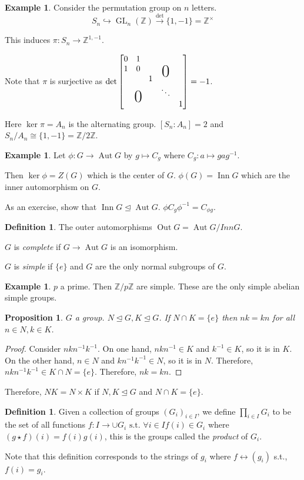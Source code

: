 \documentclass{amsart}
\newtheorem{prop}[thm]{Proposition}
\theoremstyle{definition}
\newtheorem{definition}[thm]{Definition}
\newtheorem{example}[thm]{Example}
\newcommand{\Z}{\mathbb Z}
\newcommand{\st}{\text{ s.t. }}
\DeclareMathOperator{\GL}{GL}
\newcommand\bigzero{\makebox(0,0){\text{\huge0}}}
\DeclareMathOperator{\Aut}{Aut}
\DeclareMathOperator{\Inn}{Inn}
\DeclareMathOperator{\Out}{Out}
\begin{document}
\begin{example}
	Consider the permutation group on $n$ letters. 
	$$S_n\hookrightarrow \GL_n(\Z)\overset{\det}\to\{1,-1\}=\Z^\times$$
	
	This induces $\pi:S_n\to \Z^{1,-1}$. 
	
	Note that $\pi$ is surjective as $\det\begin{bmatrix}
0&1&&&\\
1&0&&\bigzero&\\
&&1&&\\
&\bigzero&&\ddots&\\
&&&&1	
\end{bmatrix}
=-1$.

Here $\ker\pi=A_n$ is the alternating group. $[S_n:A_n]=2$ and $S_n/A_n\cong\{1,-1\}=\Z/2\Z$.
\end{example}
\begin{example}
Let $\phi:G\to \Aut G$ by $g\mapsto C_g$ where $C_g:a\mapsto gag^{-1}$.

Then $\ker\phi=Z(G)$ which is the center of $G$. $\phi(G)=\Inn G$ which are the inner automorphism on $G$. 	
\end{example}
As an exercise, show that $\Inn G\unlhd \Aut G$. $\phi C_g\phi^{-1}=C_{\phi g}$.
\begin{definition}
The outer automorphisms $\Out G=\Aut G/Inn G$.

$G$ is \emph{complete} if $G\to \Aut G$ is an isomorphism.

$G$ is \emph{simple} if $\{e\}$ and $G$ are the only normal subgroups of $G$.	
\end{definition}
\begin{example}
	$p$ a prime. Then $\Z/p\Z$ are simple. These are the only simple abelian simple groups. 	
\end{example}
\begin{prop}
$G$ a group. $N\unlhd G, K\unlhd G$. If $N\cap K=\{e\}$ then $nk=kn$ for all $n\in N, k\in K$.	
\end{prop}
\begin{proof}
Consider $nkn^{-1}k^{-1}$. On one hand, $nkn^{-1}\in K$	 and $k^{-1}\in K$, so it is in $K$. On the other hand, $n\in N$ and $kn^{-1}k^{-1}\in N$, so it is in $N$. Therefore, $nkn^{-1}k^{-1}\in K\cap N=\{e\}$. Therefore, $nk=kn$.
\end{proof}
Therefore, $NK=N\times K$ if $N,K\unlhd G$ and $N\cap K=\{e\}$.
\begin{definition}
	Given a collection of groups $(G_i)_{i\in I}$, we define $\prod\limits_{i\in I}G_i$ to be the set of all functions $f:I\to\cup G_i\st \forall i\in I f(i)\in G_i$ where $(g\star f)(i)=f(i)g(i)$, this is the groups called the \emph{product} of $G_i$.
	
	Note that this definition corresponds to the strings of $g_i$ where $f\leftrightarrow (g_i)$ s.t., $f(i)=g_i$.
\end{definition}
\end{document}
